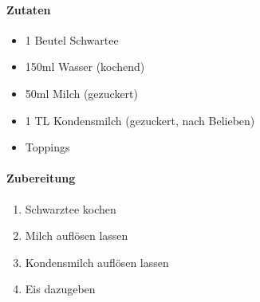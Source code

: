 \newpage
{}

\paragraph{Zutaten}
\begin{itemize}[noitemsep]
	\item 1 Beutel Schwartee
	\item 150ml Wasser (kochend)
	\item 50ml Milch (gezuckert)
	\item 1 TL Kondensmilch (gezuckert, nach Belieben)
	\item Toppings
\end{itemize}

\paragraph{Zubereitung}
\begin{enumerate}[noitemsep]
	\item Schwarztee kochen
	\item Milch auflösen lassen
	\item Kondensmilch auflösen lassen
	\item Eis dazugeben
\end{enumerate}